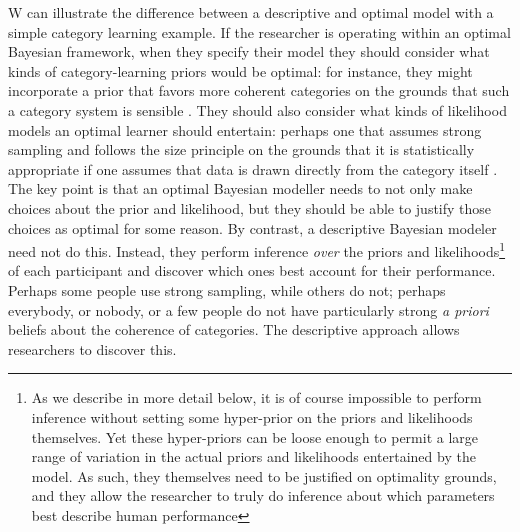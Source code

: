 \documentclass[doc,floatsintext]{apa6}
\begin{document}
W can illustrate the difference between a descriptive and optimal model with a simple category learning example. If the researcher is operating within an optimal Bayesian framework, when they specify their model they should consider what kinds of category-learning priors would be optimal: for instance, they might incorporate a prior that favors more coherent categories \cite{rosch78} on the grounds that such a category system is sensible \cite{navarro_hypothesis_2011}. They should also consider what kinds of likelihood models an optimal learner should entertain: perhaps one that assumes strong sampling and follows the size principle on the grounds that it is statistically appropriate if one assumes that data is drawn directly from the category itself \cite{Tenenbaum2001}. The key point is that an optimal Bayesian modeller needs to not only make choices about the prior and likelihood, but they should be able to justify those choices as optimal for some reason. By contrast, a descriptive Bayesian modeler need not do this. Instead, they perform inference {\it over} the priors and likelihoods\footnote{As we describe in more detail below, it is of course impossible to perform inference without setting some hyper-prior on the priors and likelihoods themselves. Yet these hyper-priors can be loose enough to permit a large range of variation in the actual priors and likelihoods entertained by the model. As such, they themselves need to be justified on optimality grounds, and they allow the researcher to truly do inference about which parameters best describe human performance} of each participant and discover which ones best account for their performance. Perhaps some people use strong sampling, while others do not; perhaps everybody, or nobody, or a few people do not have particularly strong {\it a priori} beliefs about the coherence of categories. The descriptive approach allows researchers to discover this.
\end{document}
